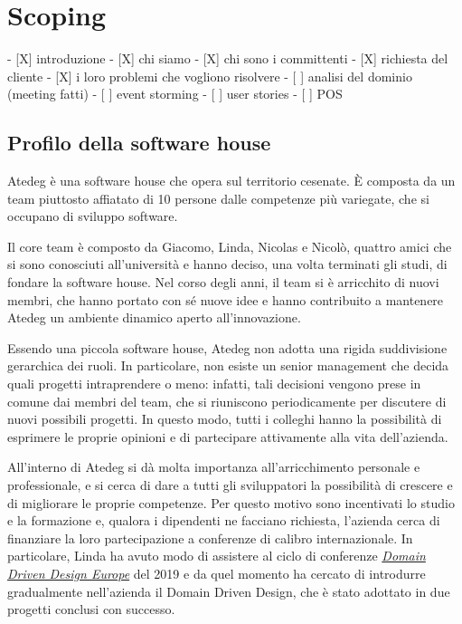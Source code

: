 \chapter{Scoping}\label{ch:scoping}

- [X] introduzione
- [X] chi siamo
- [X] chi sono i committenti
- [X] richiesta del cliente
  - [X] i loro problemi che vogliono risolvere
- [ ] analisi del dominio (meeting fatti)
  - [ ] event storming
- [ ] user stories  
- [ ] POS 


\section{Profilo della software house}\label{sec:profilo-della-software-house}
Atedeg è una software house che opera sul territorio cesenate. È composta da un team piuttosto affiatato di 10 persone dalle competenze più variegate, che si occupano di sviluppo software.

Il core team è composto da Giacomo, Linda, Nicolas e Nicolò, quattro amici che si sono conosciuti all'università e hanno deciso, una volta terminati gli studi, di fondare la software house.
Nel corso degli anni, il team si è arricchito di nuovi membri, che hanno portato con sé nuove idee e hanno contribuito a mantenere Atedeg un ambiente dinamico aperto all'innovazione. 

Essendo una piccola software house, Atedeg non adotta una rigida suddivisione gerarchica dei ruoli. In particolare, non esiste un senior management che decida quali progetti intraprendere o meno: infatti, tali decisioni vengono prese in comune dai membri del team, che si riuniscono periodicamente per discutere di nuovi possibili progetti. In questo modo, tutti i colleghi hanno la possibilità di esprimere le proprie opinioni e di partecipare attivamente alla vita dell'azienda.

All'interno di Atedeg si dà molta importanza all'arricchimento personale e professionale, e si cerca di dare a tutti gli sviluppatori la possibilità di crescere e di migliorare le proprie competenze. Per questo motivo sono incentivati lo studio e la formazione e, qualora i dipendenti ne facciano richiesta, l'azienda cerca di finanziare la loro partecipazione a conferenze di calibro internazionale.  In particolare, Linda ha avuto modo di assistere al ciclo di conferenze \href{https://dddeurope.com}{\emph{Domain Driven Design Europe}} del 2019 e da quel momento ha cercato di introdurre gradualmente nell'azienda il Domain Driven Design, che è stato adottato in due progetti conclusi con successo.

